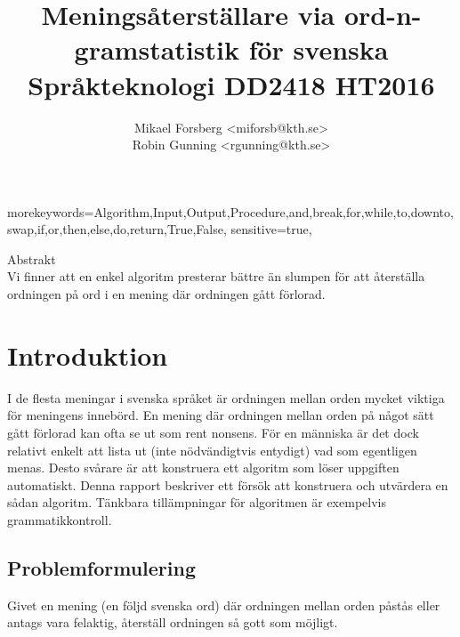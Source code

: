 \documentclass[a4paper,11pt]{article}
\begin{document}
\renewcommand*{\ttdefault}{pcr}

\lstset{numberstyle=\footnotesize\ttfamily,breaklines=true}

{
morekeywords={Algorithm,Input,Output,Procedure,and,break,for,while,to,downto,swap,if,or,then,else,do,return,True,False},
sensitive=true,
}

\title{\vspace{-1cm} Meningsåterställare via ord-n-gramstatistik för svenska\\ \small Språkteknologi DD2418 HT2016}
\author{Mikael Forsberg <miforsb@kth.se>\\Robin Gunning <rgunning@kth.se>}
\maketitle

\begin{center}
Abstrakt\\ 
Vi finner att en enkel algoritm presterar bättre än slumpen för att återställa
ordningen på ord i en mening där ordningen gått förlorad.
\end{center}

\section*{Introduktion}
I de flesta meningar i svenska språket är ordningen mellan orden mycket
viktiga för meningens innebörd. En mening där ordningen mellan orden
på något sätt gått förlorad kan ofta se ut som rent nonsens. För en
människa är det dock relativt enkelt att lista ut (inte nödvändigtvis
entydigt) vad som egentligen menas. Desto svårare är att konstruera
ett algoritm som löser uppgiften automatiskt. Denna rapport beskriver ett försök
att konstruera och utvärdera en sådan algoritm. Tänkbara tillämpningar
för algoritmen är exempelvis grammatikkontroll.

\subsection*{Problemformulering}
Givet en mening (en följd svenska ord) där ordningen mellan orden påstås eller
antags vara felaktig, återställ ordningen så gott som möjligt.
\end{document}
